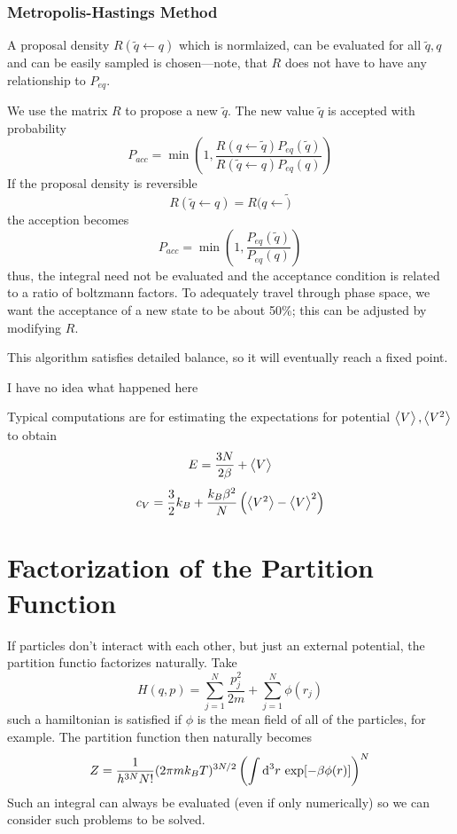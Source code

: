 \subsubsection{Metropolis-Hastings Method}
A proposal density \(R(\tilde q \leftarrow q)\) which is normlaized, can be evaluated for all \(\tilde q, q\) and can be easily sampled is chosen---note, that \(R\) does not have to have any relationship to \(P_{eq}\).

We use the matrix \(R\) to propose a new \(\tilde q\). The new value \(\tilde q\) is accepted with probability
\[P_{acc} = \min\left(1, \frac{R(q\leftarrow\tilde q)P_{eq}(\tilde q)}{R(\tilde q \leftarrow q)P_{eq}(q)}\right)\]
If the proposal density is reversible
\[R(\tilde q \leftarrow q) = R(q\leftarrow \tilde)\]
the acception becomes
\[P_{acc} = \min\left(1, \frac{P_{eq}(\tilde q)}{P_{eq}(q)}\right)\]
thus, the integral need not be evaluated and the acceptance condition is related to a ratio of boltzmann factors. To adequately travel through phase space, we want the acceptance of a new state to be about 50\%; this can be adjusted by modifying \(R\).

This algorithm satisfies detailed balance, so it will eventually reach a fixed point.

{\huge I have no idea what happened here}

Typical computations are for estimating the expectations for potential \(\left\langle \begin{matrix}V\end{matrix} \right\rangle,\left\langle \begin{matrix}V^2\end{matrix} \right\rangle\) to obtain 
\[E = \frac{3N}{2\beta}+\left\langle \begin{matrix}V\end{matrix} \right\rangle\]
\[c_V = \frac{3}{2}k_B + \frac{k_B\beta^2}{N}\left(\left\langle \begin{matrix}V^2\end{matrix} \right\rangle-\left\langle \begin{matrix}V\end{matrix} \right\rangle^2\right)\]

\section{Factorization of the Partition Function}
If particles don't interact with each other, but just an external potential, the partition functio factorizes naturally. Take
\[H(q,p) = \sum_{j=1}^N \frac{p_j^2}{2m} +\sum_{j=1}^N\phi(r_j)\]
such a hamiltonian is satisfied if \(\phi\) is the mean field of all of the particles, for example. The partition function then naturally becomes
\begin{equation}
	Z = \frac{1}{h^{3N}N!}(2\pi m k_B T)^{3N/2} \left(\int\d[3]r\exp[-\beta \phi(r)]\right)^N
\end{equation}
Such an integral can always be evaluated (even if only numerically) so we can consider such problems to be solved. 

